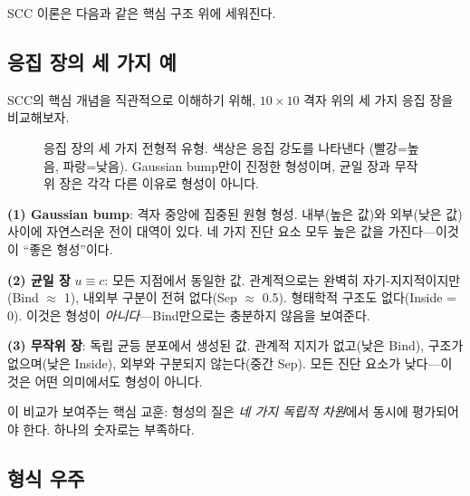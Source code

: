 SCC 이론은 다음과 같은 핵심 구조 위에 세워진다.


\subsection{응집 장의 세 가지 예}

SCC의 핵심 개념을 직관적으로 이해하기 위해, $10 \times 10$ 격자 위의 세 가지 응집 장을 비교해보자.

\begin{figure}[t]
\centering
{}
\caption{응집 장의 세 가지 전형적 유형. 색상은 응집 강도를 나타낸다 (빨강=높음, 파랑=낮음). Gaussian bump만이 진정한 형성이며, 균일 장과 무작위 장은 각각 다른 이유로 형성이 아니다.}
\label{fig:three-fields}
\end{figure}

\textbf{(1) Gaussian bump}: 격자 중앙에 집중된 원형 형성. 내부(높은 값)와 외부(낮은 값) 사이에 자연스러운 전이 대역이 있다. 네 가지 진단 요소 모두 높은 값을 가진다---이것이 ``좋은 형성''이다.

\textbf{(2) 균일 장} $u \equiv c$: 모든 지점에서 동일한 값. 관계적으로는 완벽히 자기-지지적이지만(Bind $\approx$ 1), 내외부 구분이 전혀 없다(Sep $\approx$ 0.5). 형태학적 구조도 없다(Inside = 0). 이것은 형성이 \emph{아니다}---Bind만으로는 충분하지 않음을 보여준다.

\textbf{(3) 무작위 장}: 독립 균등 분포에서 생성된 값. 관계적 지지가 없고(낮은 Bind), 구조가 없으며(낮은 Inside), 외부와 구분되지 않는다(중간 Sep). 모든 진단 요소가 낮다---이것은 어떤 의미에서도 형성이 아니다.

이 비교가 보여주는 핵심 교훈: 형성의 질은 \emph{네 가지 독립적 차원}에서 동시에 평가되어야 한다. 하나의 숫자로는 부족하다.


\subsection{형식 우주}

